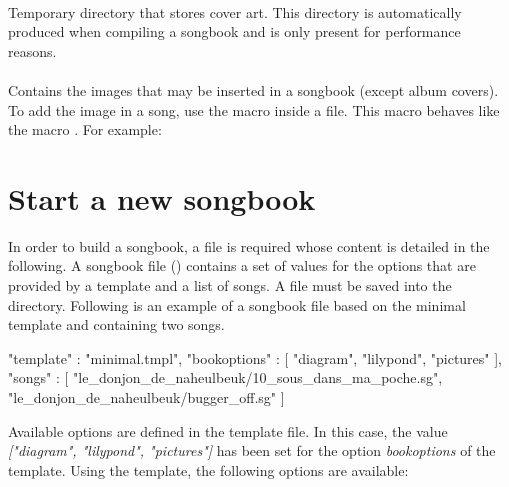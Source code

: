 \paragraph{}
Temporary directory that stores cover art. This directory is
automatically produced when compiling a songbook and is only present
for performance reasons.

\paragraph{}
Contains the images that may be inserted in a songbook (except album
covers). To add the image  in a song, use the
 macro inside a  file. This macro behaves like
the \latex macro . For example:

\begin{song}
\end{song}

\section{Start a new songbook}
\label{sec:create-songbook}

In order to build a songbook, a  file is required whose
content is detailed in the following. A songbook file ()
contains a set of values for the options that are provided by a
template and a list of songs.  A  file must be saved into the
 directory. Following is an example of a songbook
file based on the minimal template and containing two songs.

\begin{code}
{
"template" : "minimal.tmpl",
"bookoptions" : [
    "diagram",
    "lilypond",
    "pictures"
  ],
"songs" : [
    "le_donjon_de_naheulbeuk/10_sous_dans_ma_poche.sg",
    "le_donjon_de_naheulbeuk/bugger_off.sg"
  ]
}
\end{code}

Available options are defined in the template file. In this case, the
value \emph{["diagram", "lilypond", "pictures"]} has been set for the
option \emph{bookoptions} of the  template.
Using the  template, the following options are available:

